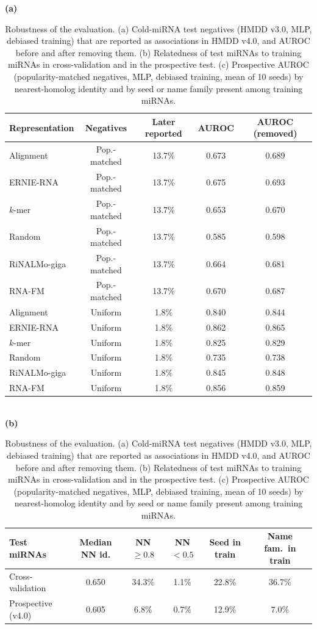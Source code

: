 \begin{table}[h]\centering\footnotesize\setlength{\tabcolsep}{4pt}
\caption{Robustness of the evaluation. (a) Cold-miRNA test negatives (HMDD v3.0, MLP, debiased training) that are reported as associations in HMDD v4.0, and AUROC before and after removing them. (b) Relatedness of test miRNAs to training miRNAs in cross-validation and in the prospective test. (c) Prospective AUROC (popularity-matched negatives, MLP, debiased training, mean of 10 seeds) by nearest-homolog identity and by seed or name family present among training miRNAs.}\label{tab:s5}
\textbf{(a)}\\[2pt]\begin{tabular}{lcccc}\toprule Representation & Negatives & Later reported & AUROC & AUROC (removed)\\\midrule
Alignment & Pop.-matched & 13.7\% & 0.673 & 0.689\\
ERNIE-RNA & Pop.-matched & 13.7\% & 0.675 & 0.693\\
$k$-mer & Pop.-matched & 13.7\% & 0.653 & 0.670\\
Random & Pop.-matched & 13.7\% & 0.585 & 0.598\\
RiNALMo-giga & Pop.-matched & 13.7\% & 0.664 & 0.681\\
RNA-FM & Pop.-matched & 13.7\% & 0.670 & 0.687\\
Alignment & Uniform & 1.8\% & 0.840 & 0.844\\
ERNIE-RNA & Uniform & 1.8\% & 0.862 & 0.865\\
$k$-mer & Uniform & 1.8\% & 0.825 & 0.829\\
Random & Uniform & 1.8\% & 0.735 & 0.738\\
RiNALMo-giga & Uniform & 1.8\% & 0.845 & 0.848\\
RNA-FM & Uniform & 1.8\% & 0.856 & 0.859\\
\bottomrule\end{tabular}\\[8pt]
\textbf{(b)}\\[2pt]\begin{tabular}{lccccc}\toprule Test miRNAs & Median NN id. & NN $\ge0.8$ & NN $<0.5$ & Seed in train & Name fam.\ in train\\\midrule
Cross-validation & 0.650 & 34.3\% & 1.1\% & 22.8\% & 36.7\%\\
Prospective (v4.0) & 0.605 & 6.8\% & 0.7\% & 12.9\% & 7.0\%\\
\bottomrule\end{tabular}\\[8pt]

\end{table}
